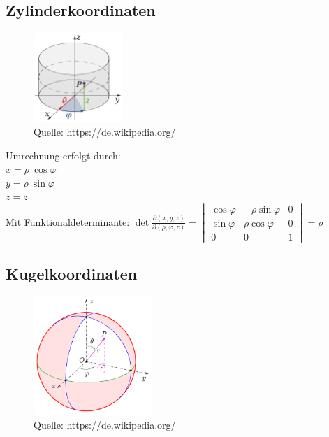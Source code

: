 \subsection{Zylinderkoordinaten}
\begin{figure}[h!]
\centering
    \includegraphics[width=0.3\textwidth]{images/zylinderkoord.png}
    \caption{Quelle: https://de.wikipedia.org/}
    
\end{figure}
Umrechnung erfolgt durch: \\
$x=\rho\ \cos\varphi$\\
$y=\rho\ \sin\varphi$\\
$z=z$\\

Mit Funktionaldeterminante:
$
\det\frac{\partial(x,y,z)}{\partial(\rho,\varphi,z)}=\begin{vmatrix}
  \cos\varphi & -\rho\sin\varphi & 0 \\
  \sin\varphi &  \rho\cos\varphi & 0 \\
            0 &                0 & 1
\end{vmatrix}=\rho$


\subsection{Kugelkoordinaten}
\begin{figure}[h!]
\centering
    \includegraphics[width=0.4\textwidth]{images/kugelkoord.png}
    \caption{Quelle: https://de.wikipedia.org/}
    
\end{figure}

